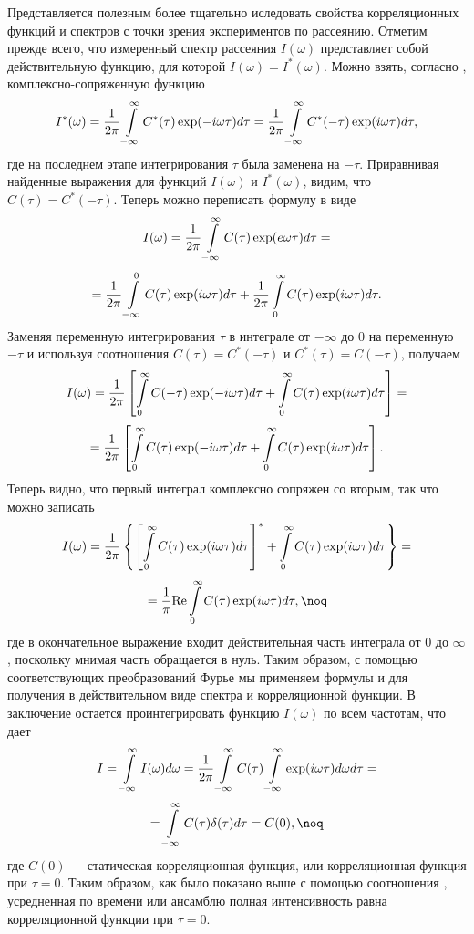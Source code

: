 Представляется полезным более тщательно иследовать свойства
корреляционных функций и спектров с точки зрения экспериментов по
рассеянию. Отметим прежде всего, что измеренный спектр рассеяния
$I(\omega)$ представляет собой действительную функцию, для которой
$I(\omega)=I^*(\omega)$. Можно взять, согласно ,
комплексно-сопряженную функцию
$$I^*(\omega)={1\over2\pi}\int\limits_{-\infty}^{\infty}C^*(\tau)\exp
(-i\omega\tau)d\tau={1\over2\pi}\int\limits_{-\infty}^{\infty}C^*(-\tau)
\exp(i\omega\tau)d\tau,$$
где на последнем этапе интегрирования $\tau$ была заменена на
$-\tau$. Приравнивая найденные выражения для функций $I(\omega)$ и
$I^*(\omega)$, видим, что $C(\tau)=C^*(-\tau)$. Теперь можно
переписать формулу  в виде
$$
I(\omega)={1\over2\pi}\int\limits_{-\infty}^{\infty}C(\tau)\exp(e\omega\tau)d\tau=$$ $$
={1\over2\pi}\int\limits_{-\infty}^{0}C(\tau)\exp(i\omega\tau)d\tau+
{1\over2\pi}\int\limits_{0}^{\infty}C(\tau)\exp(i\omega\tau)d\tau.
$$
Заменяя переменную интегрирования $\tau$ в интеграле от $-\infty$
до 0 на переменную $-\tau$ и используя соотношения
$C(\tau)=C^*(-\tau)$ и $C^*(\tau)=C(-\tau)$, получаем
$$
I(\omega)={1\over2\pi}\left[\int\limits_{0}^{\infty}C(-\tau)\exp(-i\omega\tau)d\tau+
\int\limits_{0}^{\infty}C(\tau)\exp(i\omega\tau)d\tau\right]=$$ $$
={1\over2\pi}\left[\int\limits_{0}^{\infty}C(\tau)\exp(-i\omega\tau)d\tau+
\int\limits_{0}^{\infty}C(\tau)\exp(i\omega\tau)d\tau\right].
$$
Теперь видно, что первый интеграл комплексно сопряжен со вторым,
так что можно записать
$$
I(\omega)={1\over2\pi}\left\{\left[\int\limits_{0}^{\infty}C(\tau)\exp(i\omega\tau)d\tau\right]^*+
\int\limits_{0}^{\infty}C(\tau)\exp(i\omega\tau)d\tau\right\}=$$ $$
={1\over\pi}{\rm
Re}\int\limits_{0}^{\infty}C(\tau)\exp(i\omega\tau)d\tau,
\noq$$
где в окончательное выражение входит действительная часть
интеграла от 0 до $\infty$, поскольку мнимая часть обращается в
нуль. Таким образом, с помощью соответствующих преобразований
Фурье мы применяем формулы  и  для получения в
действительном виде спектра и корреляционной функции. В
заключение остается проинтегрировать функцию $I(\omega)$ по всем
частотам, что дает
$$
I=\int\limits_{-\infty}^{\infty}I(\omega)d\omega={1\over2\pi}
\int\limits_{-\infty}^{\infty}C(\tau)\int\limits_{-\infty}^{\infty}
\exp(i\omega\tau)d\omega d\tau=$$ $$
=\int\limits_{-\infty}^{\infty}C(\tau)\delta(\tau)d\tau=C(0),
\noq$$
где $C(0)$ --- статическая корреляционная функция, или
корреляционная функция при $\tau=0$. Таким образом, как было
показано выше с помощью соотношения , усредненная по
времени или ансамблю полная интенсивность равна корреляционной
функции при $\tau=0$.

